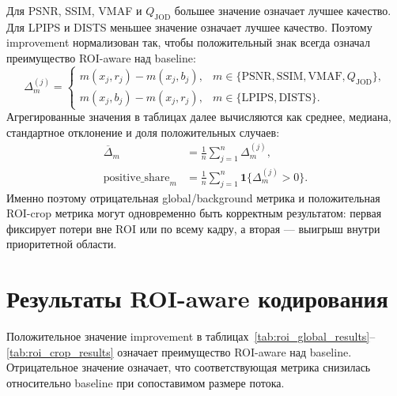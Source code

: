 \documentclass[12pt,a4paper,oneside,openany]{report}
\begin{document}
Для PSNR, SSIM, VMAF и $Q_{\mathrm{JOD}}$ большее значение означает лучшее качество. Для LPIPS
и DISTS меньшее значение означает лучшее качество. Поэтому improvement нормализован так, чтобы
положительный знак всегда означал преимущество ROI-aware над baseline:
\begin{equation}
  \Delta_m^{(j)} =
  \begin{cases}
    m(x_j,r_j)-m(x_j,b_j),
      & m\in\{\mathrm{PSNR},\mathrm{SSIM},\mathrm{VMAF},Q_{\mathrm{JOD}}\},\\
    m(x_j,b_j)-m(x_j,r_j),
      & m\in\{\mathrm{LPIPS},\mathrm{DISTS}\}.
  \end{cases}
  \label{eq:metric_improvement}
\end{equation}
Агрегированные значения в таблицах далее вычисляются как среднее, медиана, стандартное
отклонение и доля положительных случаев:
\begin{align}
  \overline{\Delta}_m &= \frac{1}{n}\sum_{j=1}^{n}\Delta_m^{(j)},\\
  \operatorname{positive\_share}_m
  &= \frac{1}{n}\sum_{j=1}^{n}\mathbf{1}\{\Delta_m^{(j)}>0\}.
  \label{eq:positive_share}
\end{align}
Именно поэтому отрицательная global/background метрика и положительная ROI-crop метрика могут
одновременно быть корректным результатом: первая фиксирует потери вне ROI или по всему кадру, а
вторая --- выигрыш внутри приоритетной области.


\section{Результаты ROI-aware кодирования}

Положительное значение improvement
в таблицах~\ref{tab:roi_global_results}--\ref{tab:roi_crop_results} означает преимущество
ROI-aware над baseline. Отрицательное значение означает, что соответствующая метрика снизилась
относительно baseline при сопоставимом размере потока.
\end{document}
